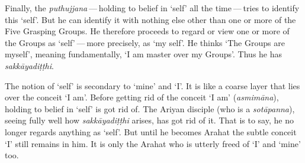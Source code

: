 Finally, the \emph{puthujjana} --- holding to belief in `self' all the time --- tries to identify this `self'. But he can identify it with nothing else other than one or more of the Five Grasping Groups. He therefore proceeds to regard or view one or more of the Groups as `self' --- more precisely, as `my self'. He thinks `The Groups are myself', meaning fundamentally, `I am master over my Groups'. Thus he has \emph{sakkāyadiṭṭhi}.

The notion of `self' is secondary to `mine' and `I'. It is like a coarse layer that lies over the conceit `I am'. Before getting rid of the conceit `I am' (\emph{asmimāna}), holding to belief in `self' is got rid of. The Ariyan disciple (who is a \emph{sotāpanna}), seeing fully well how \emph{sakkāyadiṭṭhi} arises, has got rid of it. That is to say, he no longer regards anything as `self'. But until he becomes Arahat the subtle conceit `I' still remains in him. It is only the Arahat who is utterly freed of `I' and `mine' too.
